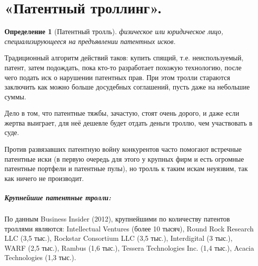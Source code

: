 \documentclass[11pt]{article}
\theoremstyle{plain} %
\newtheorem{proposition}[theorem]{Определение}
\theoremstyle{definition} %
\theoremstyle{remark} %
\begin{document}
\section{«Патентный троллинг».}\label{erste}

\begin{proposition}[Патентный тролль]
	физическое или юридическое лицо, специализирующееся на предъявлении патентных исков.
\end{proposition}

Традиционный алгоритм действий таков: купить спящий, т.е. неиспользуемый, патент, затем подождать, пока кто-то разработает похожую технологию, после чего подать иск о нарушении патентных прав. При этом тролли стараются заключить как можно больше досудебных соглашений, пусть даже на небольшие суммы.

Дело в том, что патентные тяжбы, зачастую, стоят очень дорого, и даже если жертва выиграет, для неё дешевле будет отдать деньги троллю, чем участвовать в суде.

Против развязавших патентную войну конкурентов часто помогают встречные патентные иски (в первую очередь для этого у крупных фирм и есть огромные патентные портфели и патентные пулы), но тролль к таким искам неуязвим, так как ничего не производит.

\subparagraph{Крупнейшие патентные тролли:}
По данным Business Insider (2012), крупнейшими по количеству патентов троллями являются: Intellectual Ventures (более 10 тысяч), Round Rock Research LLC (3,5 тыс.), Rockstar Consortium LLC (3,5 тыс.), Interdigital (3 тыс.), WARF (2,5 тыс.), Rambus (1,6 тыс.), Tessera Technologies Inc. (1,4 тыс.), Acacia Technologies (1,3 тыс.).
\end{document}

